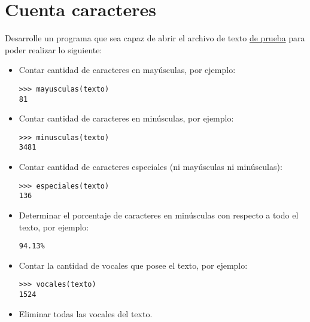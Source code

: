 \section{Cuenta caracteres}

Desarrolle un programa que sea capaz de abrir el archivo de texto
\href{../../\_static/texto.txt}{de prueba} para poder realizar lo
siguiente:

\begin{itemize}
\item
  Contar cantidad de caracteres en mayúsculas, por ejemplo:

\begin{lstlisting}
>>> mayusculas(texto)
81
\end{lstlisting}
\item
  Contar cantidad de caracteres en minúsculas, por ejemplo:

\begin{lstlisting}
>>> minusculas(texto)
3481
\end{lstlisting}
\item
  Contar cantidad de caracteres especiales (ni mayúsculas ni
  minúsculas):

\begin{lstlisting}
>>> especiales(texto)
136
\end{lstlisting}
\item
  Determinar el porcentaje de caracteres en minúsculas con respecto a
  todo el texto, por ejemplo:

\begin{lstlisting}
94.13%
\end{lstlisting}
\item
  Contar la cantidad de vocales que posee el texto, por ejemplo:

\begin{lstlisting}
>>> vocales(texto)
1524
\end{lstlisting}
\item
  Eliminar todas las vocales del texto.
\end{itemize}

